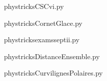     

    \clearpage
    


    \newcommand{\CaptionFigCSCvi}{<+Type your caption here+>}
    \begin{center}
        
    \end{center}
    phystricksCSCvi.py

    

    \clearpage
    


    \newcommand{\CaptionFigCornetGlace}{<+Type your caption here+>}
    \begin{center}
        
    \end{center}
    phystricksCornetGlace.py

    

    \clearpage
    


    \newcommand{\CaptionFigexamsseptii}{<+Type your caption here+>}
    \begin{center}
        
    \end{center}
    phystricksexamsseptii.py

    

    \clearpage
    


    \newcommand{\CaptionFigDistanceEnsemble}{<+Type your caption here+>}
    \begin{center}
        
    \end{center}
    phystricksDistanceEnsemble.py

    

    \clearpage
    


    \newcommand{\CaptionFigCurvilignesPolaires}{<+Type your caption here+>}
    \begin{center}
        
    \end{center}
    phystricksCurvilignesPolaires.py

    

    \clearpage
    


